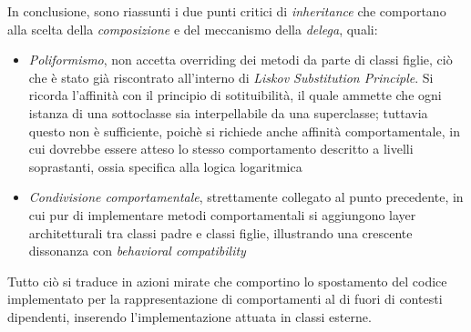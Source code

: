 \documentclass{article}
\begin{document}
In conclusione, sono riassunti i due punti critici di \textit{inheritance} che comportano alla scelta della \textit{composizione} e del meccanismo della \textit{delega}, quali:
\begin{itemize}[label={-}]
    \itemsep0em
    \item \textit{Poliformismo}, non accetta overriding dei metodi da parte di classi figlie, ciò che è stato già riscontrato all'interno di \textit{Liskov Substitution Principle}. Si ricorda l'affinità con il principio di sotituibilità, il quale ammette che ogni istanza di una sottoclasse sia interpellabile da una superclasse; tuttavia questo non è sufficiente, poichè si richiede anche affinità comportamentale, in cui dovrebbe essere atteso lo stesso comportamento descritto a livelli soprastanti, ossia specifica alla logica logaritmica
    \item \textit{Condivisione comportamentale}, strettamente collegato al punto precedente, in cui pur di implementare metodi comportamentali si aggiungono layer architetturali tra classi padre e classi figlie, illustrando una crescente dissonanza con \textit{behavioral compatibility}
\end{itemize}
Tutto ciò si traduce in azioni mirate che comportino lo spostamento del codice implementato per la rappresentazione di comportamenti al di fuori di contesti dipendenti, inserendo l'implementazione attuata in classi esterne.
\end{document}
